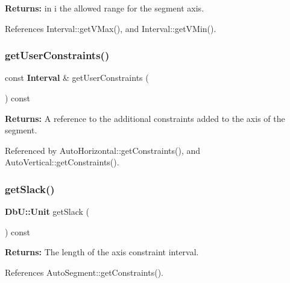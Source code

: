 {\bfseries Returns\+:} in {\ttfamily i} the allowed range for the segment axis. 

References Interval\+::get\+V\+Max(), and Interval\+::get\+V\+Min().

\mbox{\label{classKatabatic_1_1AutoSegment_aa7cf8d4df6a5d945dd180d45e8bbcedf}} 
\subsubsection{\texorpdfstring{get\+User\+Constraints()}{getUserConstraints()}}
{\footnotesize\ttfamily const \textbf{ Interval} \& get\+User\+Constraints (\begin{DoxyParamCaption}{ }\end{DoxyParamCaption}) const\hspace{0.3cm}{\ttfamily [inline]}}

{\bfseries Returns\+:} A reference to the additional constraints added to the axis of the segment. 

Referenced by Auto\+Horizontal\+::get\+Constraints(), and Auto\+Vertical\+::get\+Constraints().

\mbox{\label{classKatabatic_1_1AutoSegment_a8789ebe71b2ff3d0265f5319a3be5afb}} 
\subsubsection{\texorpdfstring{get\+Slack()}{getSlack()}}
{\footnotesize\ttfamily \textbf{ Db\+U\+::\+Unit} get\+Slack (\begin{DoxyParamCaption}{ }\end{DoxyParamCaption}) const\hspace{0.3cm}{\ttfamily [virtual]}}

{\bfseries Returns\+:} The length of the axis constraint interval. 

References Auto\+Segment\+::get\+Constraints().

\mbox{\label{classKatabatic_1_1AutoSegment_a9405b4f5345d116f71c40ba2c16097d0}} 
